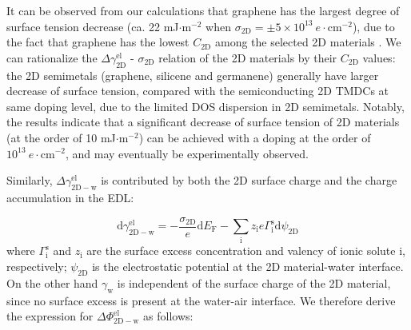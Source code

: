 \documentclass[aps,prl,reprint,groupedaddress,amsmath,amssymb, showpacs]{revtex4-1}
\begin{document}
It can be observed from our calculations that graphene has the largest
degree of surface tension decrease (ca. 22 mJ\(\cdot\mathrm{m}^{-2}\)
when \(\sigma_{\mathrm{2D}}=\pm5\times10^{13}\ e\cdot
\mathrm{cm}^{-2}\)), due to the fact that graphene has the lowest
\(C_{\mathrm{2D}}\) among the selected 2D materials
\cite{tian_multiscale_2016}. We can rationalize the \(\Delta
\gamma_{\mathrm{2D}}^{\mathrm{el}}\) - \(\sigma_{\mathrm{2D}}\) relation
of the 2D materials by their \(C_{\mathrm{2D}}\) values: the 2D
semimetals (graphene, silicene and germanene) generally have larger
decrease of surface tension, compared with the semiconducting 2D TMDCs
at same doping level, due to the limited DOS dispersion in 2D
semimetals. Notably, the results indicate that a significant decrease
of surface tension of 2D materials (at the order of 10 mJ\(\cdot
\mathrm{m}^{-2}\)) can be achieved with a doping at the order of
\(10^{13}\ e\cdot \mathrm{cm}^{-2}\), and may eventually be experimentally
observed.

Similarly, \(\Delta \gamma_{\mathrm{2D-w}}^{\mathrm{el}}\) is
contributed by both the 2D surface charge and the charge accumulation
in the EDL:

\begin{equation}
\label{eqn:dgamma-2D-w}
\mathrm{d}\gamma_{\mathrm{2D-w}}^{\mathrm{el}} = -\frac{\sigma_{\mathrm{2D}}}{e} \mathrm{d}E_{\mathrm{F}}
-\sum_{\mathrm{i}} z_{\mathrm{i}}e\Gamma_{\mathrm{i}}^{\mathrm{s}} \mathrm{d}\psi_{\mathrm{2D}}
\end{equation}
where \(\Gamma_{\mathrm{i}}^{\mathrm{s}}\) and \(z_{\mathrm{i}}\) are the
surface excess concentration and valency of ionic solute i,
respectively; \(\psi_{\mathrm{2D}}\) is the electrostatic potential at the 2D
material-water interface. On the other hand \(\gamma_{\mathrm{w}}\) is
independent of the surface charge of the 2D material, since no surface
excess is present at the water-air interface. We therefore derive
the expression for \(\Delta \Phi_{\mathrm{2D-w}}^{\mathrm{el}}\) as
follows:
\end{document}

